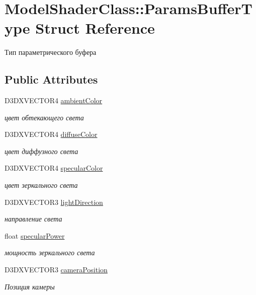 \hypertarget{struct_model_shader_class_1_1_params_buffer_type}{}\section{Model\+Shader\+Class\+:\+:Params\+Buffer\+Type Struct Reference}
\label{struct_model_shader_class_1_1_params_buffer_type}


Тип параметрического буфера  


\subsection*{Public Attributes}
\begin{DoxyCompactItemize}
\item 
D3\+D\+X\+V\+E\+C\+T\+O\+R4 \hyperlink{struct_model_shader_class_1_1_params_buffer_type_aa09ae2301735f28c668260274c491c5c}{ambient\+Color}
\begin{DoxyCompactList}\small\item\em цвет обтекающего света \end{DoxyCompactList}\item 
D3\+D\+X\+V\+E\+C\+T\+O\+R4 \hyperlink{struct_model_shader_class_1_1_params_buffer_type_aadbc607e1dbf2bad6f968240ed1077ca}{diffuse\+Color}
\begin{DoxyCompactList}\small\item\em цвет диффузного света \end{DoxyCompactList}\item 
D3\+D\+X\+V\+E\+C\+T\+O\+R4 \hyperlink{struct_model_shader_class_1_1_params_buffer_type_ae9de719f0af159302f603a536d0286d9}{specular\+Color}
\begin{DoxyCompactList}\small\item\em цвет зеркального света \end{DoxyCompactList}\item 
D3\+D\+X\+V\+E\+C\+T\+O\+R3 \hyperlink{struct_model_shader_class_1_1_params_buffer_type_a220459f90eceefd020bd2962f91c2c67}{light\+Direction}
\begin{DoxyCompactList}\small\item\em направление света \end{DoxyCompactList}\item 
float \hyperlink{struct_model_shader_class_1_1_params_buffer_type_a5bb14b5489704393ef037eae71734245}{specular\+Power}
\begin{DoxyCompactList}\small\item\em мощность зеркального света \end{DoxyCompactList}\item 
D3\+D\+X\+V\+E\+C\+T\+O\+R3 \hyperlink{struct_model_shader_class_1_1_params_buffer_type_a49767e3c773979ce6ef6119b25b53684}{camera\+Position}
\begin{DoxyCompactList}\small\item\em Позиция камеры \end{DoxyCompactList}\end{DoxyCompactItemize}


